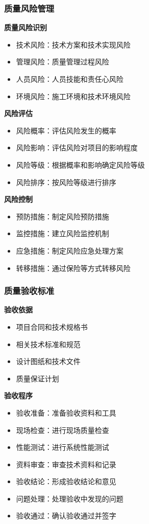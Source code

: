 \documentclass[UTF8,a4paper,12pt]{article}
\begin{document}
\subsubsection{质量风险管理}
\textbf{质量风险识别}
\begin{itemize}
    \item 技术风险：技术方案和技术实现风险
    \item 管理风险：质量管理过程风险
    \item 人员风险：人员技能和责任心风险
    \item 环境风险：施工环境和技术环境风险
\end{itemize}

\textbf{风险评估}
\begin{itemize}
    \item 风险概率：评估风险发生的概率
    \item 风险影响：评估风险对项目的影响程度
    \item 风险等级：根据概率和影响确定风险等级
    \item 风险排序：按风险等级进行排序
\end{itemize}

\textbf{风险控制}
\begin{itemize}
    \item 预防措施：制定风险预防措施
    \item 监控措施：建立风险监控机制
    \item 应急措施：制定风险应急处理方案
    \item 转移措施：通过保险等方式转移风险
\end{itemize}

\subsubsection{质量验收标准}
\textbf{验收依据}
\begin{itemize}
    \item 项目合同和技术规格书
    \item 相关技术标准和规范
    \item 设计图纸和技术文件
    \item 质量保证计划
\end{itemize}

\textbf{验收程序}
\begin{itemize}
    \item 验收准备：准备验收资料和工具
    \item 现场检查：进行现场质量检查
    \item 性能测试：进行系统性能测试
    \item 资料审查：审查技术资料和记录
    \item 验收结论：形成验收结论和意见
    \item 问题处理：处理验收中发现的问题
    \item 验收通过：确认验收通过并签字
\end{itemize}
\end{document}
